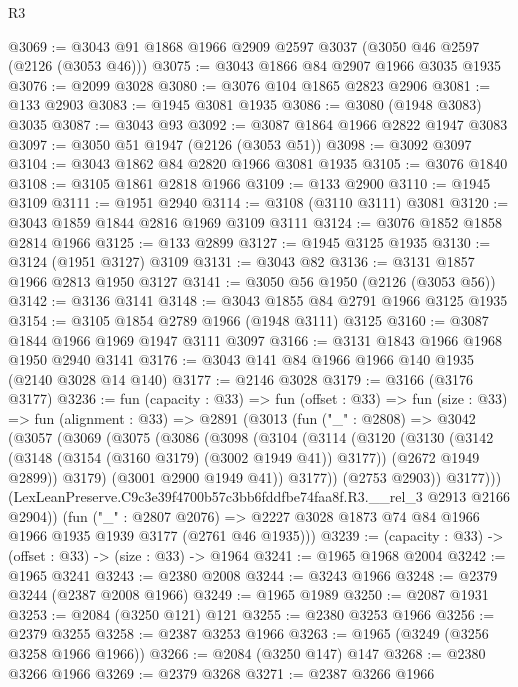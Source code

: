 \begin{lexlean}{R3}
\begin{coremodule}
@3069 := @3043 @91 @1868 @1966 @2909 @2597 @3037 (@3050 @46 @2597 (@2126 (@3053 @46)))
@3075 := @3043 @1866 @84 @2907 @1966 @3035 @1935
@3076 := @2099 @3028
@3080 := @3076 @104 @1865 @2823 @2906
@3081 := @133 @2903
@3083 := @1945 @3081 @1935
@3086 := @3080 (@1948 @3083) @3035
@3087 := @3043 @93
@3092 := @3087 @1864 @1966 @2822 @1947 @3083
@3097 := @3050 @51 @1947 (@2126 (@3053 @51))
@3098 := @3092 @3097
@3104 := @3043 @1862 @84 @2820 @1966 @3081 @1935
@3105 := @3076 @1840
@3108 := @3105 @1861 @2818 @1966
@3109 := @133 @2900
@3110 := @1945 @3109
@3111 := @1951 @2940
@3114 := @3108 (@3110 @3111) @3081
@3120 := @3043 @1859 @1844 @2816 @1969 @3109 @3111
@3124 := @3076 @1852 @1858 @2814 @1966
@3125 := @133 @2899
@3127 := @1945 @3125 @1935
@3130 := @3124 (@1951 @3127) @3109
@3131 := @3043 @82
@3136 := @3131 @1857 @1966 @2813 @1950 @3127
@3141 := @3050 @56 @1950 (@2126 (@3053 @56))
@3142 := @3136 @3141
@3148 := @3043 @1855 @84 @2791 @1966 @3125 @1935
@3154 := @3105 @1854 @2789 @1966 (@1948 @3111) @3125
@3160 := @3087 @1844 @1966 @1969 @1947 @3111 @3097
@3166 := @3131 @1843 @1966 @1968 @1950 @2940 @3141
@3176 := @3043 @141 @84 @1966 @1966 @140 @1935 (@2140 @3028 @14 @140)
@3177 := @2146 @3028
@3179 := @3166 (@3176 @3177)
@3236 := fun (capacity : @33) =>
  fun (offset : @33) =>
  fun (size : @33) =>
  fun (alignment : @33) =>
  @2891
    (@3013
      (fun ("_" : @2808) =>
      @3042
        (@3057
          (@3069
            (@3075
              (@3086
                (@3098
                  (@3104
                    (@3114
                      (@3120
                        (@3130
                          (@3142 (@3148 (@3154 (@3160 @3179) (@3002 @1949 @41)) @3177))
                          (@2672 @1949 @2899))
                        @3179)
                      (@3001 @2900 @1949 @41))
                    @3177))
                (@2753 @2903))
              @3177)))
        (LexLeanPreserve.C9c3e39f4700b57c3bb6fddfbe74faa8f.R3.__rel_3 @2913 @2166 @2904))
      (fun ("_" : @2807 @2076) =>
      @2227 @3028 @1873 @74 @84 @1966 @1966 @1935 @1939 @3177 (@2761 @46 @1935)))
@3239 := (capacity : @33) -> (offset : @33) -> (size : @33) -> @1964
@3241 := @1965 @1968 @2004
@3242 := @1965 @3241
@3243 := @2380 @2008
@3244 := @3243 @1966
@3248 := @2379 @3244 (@2387 @2008 @1966)
@3249 := @1965 @1989
@3250 := @2087 @1931
@3253 := @2084 (@3250 @121) @121
@3255 := @2380 @3253 @1966
@3256 := @2379 @3255
@3258 := @2387 @3253 @1966
@3263 := @1965 (@3249 (@3256 @3258 @1966 @1966))
@3266 := @2084 (@3250 @147) @147
@3268 := @2380 @3266 @1966
@3269 := @2379 @3268
@3271 := @2387 @3266 @1966

\end{coremodule}
\end{lexlean}
